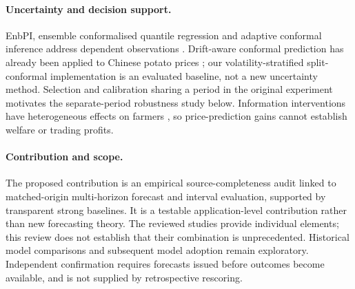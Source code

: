 \paragraph{Uncertainty and decision support.}
EnbPI, ensemble conformalised quantile regression and adaptive conformal inference address dependent observations \cite{xu2023conformal,jensen2024encqr,gibbs2021adaptive}. Drift-aware conformal prediction has already been applied to Chinese potato prices \cite{ouyang2026potato}; our volatility-stratified split-conformal implementation is an evaluated baseline, not a new uncertainty method. Selection and calibration sharing a period in the original experiment motivates the separate-period robustness study below. Information interventions have heterogeneous effects on farmers \cite{jensen2007digital,goyal2010information,fafchamps2012sms,mitra2018asymmetric}, so price-prediction gains cannot establish welfare or trading profits.

\paragraph{Contribution and scope.}
The proposed contribution is an empirical source-completeness audit linked to matched-origin multi-horizon forecast and interval evaluation, supported by transparent strong baselines. It is a testable application-level contribution rather than new forecasting theory. The reviewed studies provide individual elements; this review does not establish that their combination is unprecedented. Historical model comparisons and subsequent model adoption remain exploratory. Independent confirmation requires forecasts issued before outcomes become available, and is not supplied by retrospective rescoring.
